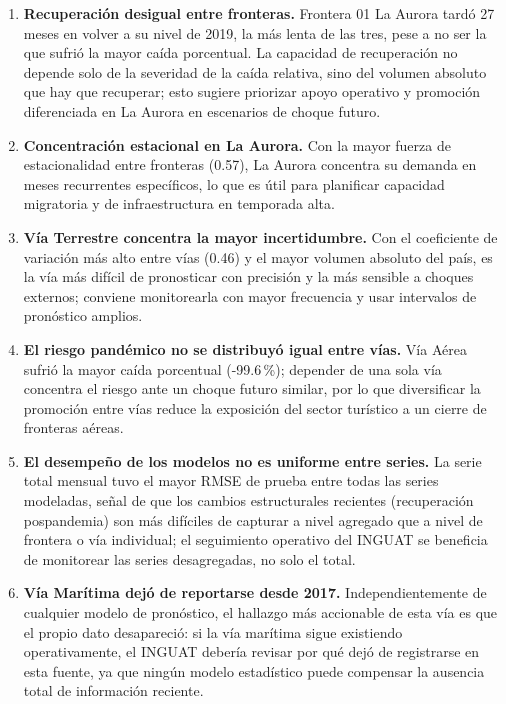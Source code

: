 \documentclass[12pt]{article}
\begin{document}
\begin{enumerate}
    \item \textbf{Recuperación desigual entre fronteras.} Frontera 01 La Aurora tardó 27 meses en volver a su nivel de 2019, la más lenta de las tres, pese a no ser la que sufrió la mayor caída porcentual. La capacidad de recuperación no depende solo de la severidad de la caída relativa, sino del volumen absoluto que hay que recuperar; esto sugiere priorizar apoyo operativo y promoción diferenciada en La Aurora en escenarios de choque futuro.
    \item \textbf{Concentración estacional en La Aurora.} Con la mayor fuerza de estacionalidad entre fronteras (0.57), La Aurora concentra su demanda en meses recurrentes específicos, lo que es útil para planificar capacidad migratoria y de infraestructura en temporada alta.
    \item \textbf{Vía Terrestre concentra la mayor incertidumbre.} Con el coeficiente de variación más alto entre vías (0.46) y el mayor volumen absoluto del país, es la vía más difícil de pronosticar con precisión y la más sensible a choques externos; conviene monitorearla con mayor frecuencia y usar intervalos de pronóstico amplios.
    \item \textbf{El riesgo pandémico no se distribuyó igual entre vías.} Vía Aérea sufrió la mayor caída porcentual (-99.6\,\%); depender de una sola vía concentra el riesgo ante un choque futuro similar, por lo que diversificar la promoción entre vías reduce la exposición del sector turístico a un cierre de fronteras aéreas.
    \item \textbf{El desempeño de los modelos no es uniforme entre series.} La serie total mensual tuvo el mayor RMSE de prueba entre todas las series modeladas, señal de que los cambios estructurales recientes (recuperación pospandemia) son más difíciles de capturar a nivel agregado que a nivel de frontera o vía individual; el seguimiento operativo del INGUAT se beneficia de monitorear las series desagregadas, no solo el total.
    \item \textbf{Vía Marítima dejó de reportarse desde 2017.} Independientemente de cualquier modelo de pronóstico, el hallazgo más accionable de esta vía es que el propio dato desapareció: si la vía marítima sigue existiendo operativamente, el INGUAT debería revisar por qué dejó de registrarse en esta fuente, ya que ningún modelo estadístico puede compensar la ausencia total de información reciente.
\end{enumerate}
\end{document}
